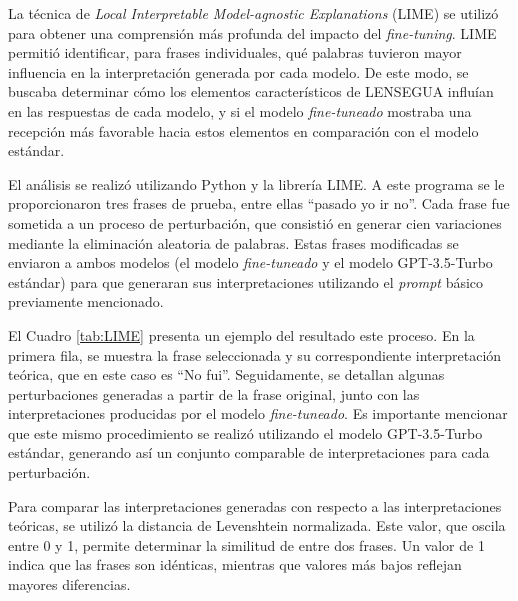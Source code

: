 La técnica de \textit{Local Interpretable Model-agnostic Explanations} (LIME) se utilizó para obtener una comprensión más profunda del impacto del \textit{fine-tuning}. LIME permitió identificar, para frases individuales, qué palabras tuvieron mayor influencia en la interpretación generada por cada modelo. De este modo, se buscaba determinar cómo los elementos característicos de LENSEGUA influían en las respuestas de cada modelo, y si el modelo \textit{fine-tuneado} mostraba una recepción más favorable hacia estos elementos en comparación con el modelo estándar.

El análisis se realizó utilizando Python y la librería LIME. A este programa se le proporcionaron tres frases de prueba, entre ellas “pasado yo ir no”. Cada frase fue sometida a un proceso de perturbación, que consistió en generar cien variaciones mediante la eliminación aleatoria de palabras. Estas frases modificadas se enviaron a ambos modelos (el modelo \textit{fine-tuneado} y el modelo GPT-3.5-Turbo estándar) para que generaran sus interpretaciones utilizando el \textit{prompt} básico previamente mencionado.

El Cuadro \ref{tab:LIME} presenta un ejemplo del resultado este proceso. En la primera fila, se muestra la frase seleccionada y su correspondiente interpretación teórica, que en este caso es “No fui”. Seguidamente, se detallan algunas perturbaciones generadas a partir de la frase original, junto con las interpretaciones producidas por el modelo \textit{fine-tuneado}. Es importante mencionar que este mismo procedimiento se realizó utilizando el modelo GPT-3.5-Turbo estándar, generando así un conjunto comparable de interpretaciones para cada perturbación.

Para comparar las interpretaciones generadas con respecto a las interpretaciones teóricas, se utilizó la distancia de Levenshtein normalizada. Este valor, que oscila entre 0 y 1, permite determinar la similitud de entre dos frases. Un valor de 1 indica que las frases son idénticas, mientras que valores más bajos reflejan mayores diferencias.

